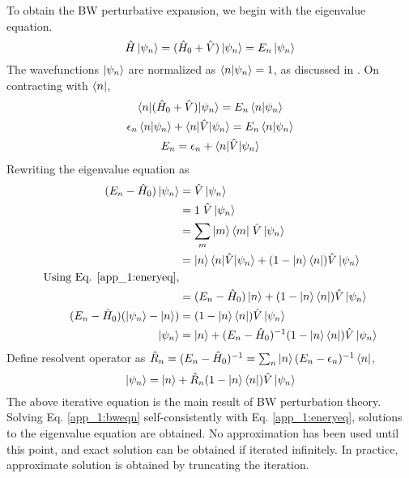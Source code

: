 To obtain the BW perturbative expansion, we begin with the eigenvalue equation. 
\begin{equation*}
 \hat{H}\ket{\psi_n} = (\hat{H}_{0} + \hat{V})\ket{\psi_n} = E_n\ket{\psi_n}
\end{equation*}
The wavefunctions $\ket{\psi_n}$ are normalized as $\braket{n|\psi_n} = 1$, as discussed in \cite{sakurai2011modern}. On 
contracting with $\bra{n}$,
\begin{gather}
 \braket{n|(\hat{H}_{0} + \hat{V})| \psi_n} = E_n\braket{n|\psi_n} \nonumber \\
 \epsilon_n \braket{n|\psi_n} + \braket{n|\hat{V}|\psi_n} = E_n\braket{n|\psi_n} \nonumber \\
 \label{app_1:eneryeq} E_n = \epsilon_n + \braket{n|\hat{V}|\psi_n}
\end{gather}
Rewriting the eigenvalue equation as
\begin{align*}
 (E_n - \hat{H}_{0})\ket{\psi_n} &= \hat{V}\ket{\psi_n} \\
 &= \mathrm{1}\; \hat{V}\ket{\psi_n} \\
 &= \sum_{m}{\ket{m}\bra{m}}\; \hat{V}\ket{\psi_n} \\
 &= \ket{n}\braket{n|\hat{V}|\psi_n} + (\mathrm{1} - \ket{n}\bra{n})\hat{V}\ket{\psi_n} \\
 \text{Using Eq. \ref{app_1:eneryeq},} \\
 &= (E_n - \hat{H}_{0})\ket{n} + (\mathrm{1} - \ket{n}\bra{n})\hat{V}\ket{\psi_n} \\
 (E_n - \hat{H}_{0}) (\ket{\psi_n} - \ket{n}) &= (\mathrm{1} - \ket{n}\bra{n})\hat{V}\ket{\psi_n} \\
 \ket{\psi_n} &= \ket{n} + (E_n - \hat{H}_{0})^{-1} (\mathrm{1} - \ket{n}\bra{n})\hat{V}\ket{\psi_n}
\end{align*}
Define resolvent operator as $\hat{R}_{n} = (E_n - \hat{H}_{0})^{-1} = \sum_{n}{\ket{n}(E_n - \epsilon_n)^{-1} \bra{n}}$,
\begin{equation}
  \label{app_1:bweqn}\ket{\psi_n} = \ket{n} +  \hat{R}_{n}(\mathrm{1} - \ket{n}\bra{n})\hat{V}\ket{\psi_n}
\end{equation}
The above iterative equation is the main result of BW perturbation theory. Solving Eq. \eqref{app_1:bweqn} self-consistently with 
Eq. \eqref{app_1:eneryeq}, solutions to the eigenvalue equation are obtained. No approximation has been used until this point, and
exact solution can be obtained if iterated infinitely. In practice, approximate solution is obtained by truncating the iteration.

